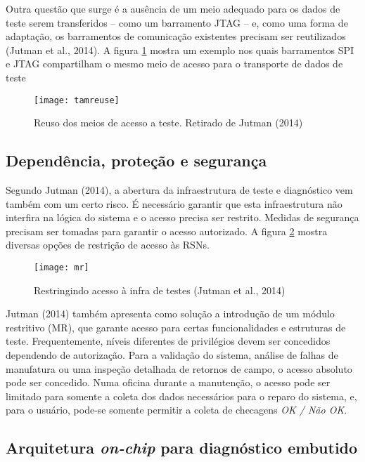 Outra questão que surge é a ausência de um meio adequado para os dados de teste serem transferidos -- como um barramento JTAG -- e, como uma forma de adaptação, os barramentos de comunicação existentes precisam ser reutilizados (Jutman et al., 2014). A figura \ref{fig:tamreuse} mostra um exemplo nos quais barramentos SPI e JTAG compartilham o mesmo meio de acesso para o transporte de dados de teste \citep{cook2012reuse}

\begin{figure}
\centering
\texttt{[image: tamreuse]}
\caption{Reuso dos meios de acesso a teste. Retirado de Jutman (2014)}
\label{fig:tamreuse}
\end{figure}

\subsection{Dependência, proteção e segurança}
Segundo Jutman (2014), a abertura da infraestrutura de teste e diagnóstico vem também com um certo risco. É necessário garantir que esta infraestrutura não interfira na lógica do sistema e o acesso precisa ser restrito. Medidas de segurança precisam ser tomadas para garantir o acesso autorizado\citep{baranowski2013securing}.
A figura \ref{fig:mr} mostra diversas opções de restrição de acesso às RSNs.
\begin{figure}
    \centering
    \texttt{[image: mr]}
    \caption{Restringindo acesso à infra de testes (Jutman et al., 2014)}
        \label{fig:mr}
\end{figure}
Jutman (2014) também apresenta como solução a introdução de um módulo restritivo (MR), que garante acesso para certas funcionalidades e estruturas de teste. Frequentemente, níveis diferentes de privilégios devem ser concedidos dependendo de autorização. Para a validação do sistema, análise de falhas de manufatura ou uma inspeção detalhada de retornos de campo, o acesso absoluto pode ser concedido. Numa oficina durante a manutenção, o acesso pode ser limitado para somente a coleta dos dados necessários para o reparo do sistema, e, para o usuário, pode-se somente permitir a coleta de checagens \textit{OK / Não OK}.

\subsection{Arquitetura \textit{on-chip} para diagnóstico embutido}
%

